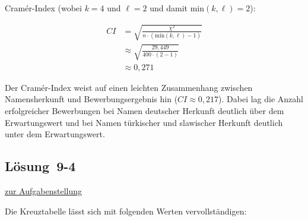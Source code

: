 \documentclass[
  11pt,
  ngerman,
  a4paper,
]{report}
\begin{document}
Cramér-Index (wobei \(k=4\) und \(\ell=2\) und damit \(\mathrm{min}(k,\ell)=2\)):

\[
\begin{aligned}
\mathit{CI}&=\sqrt{\frac{\chi^2}{n\cdot (\mathrm{min}(k, \ell)-1)}}\\[6pt]
&\approx\sqrt{\frac{29{,}449}{400\cdot(2-1)}}\\[4pt]
&\approx0{,}271
\end{aligned}
\]

Der Cramér-Index weist auf einen leichten Zusammenhang zwischen Namensherkunft und Bewerbungsergebnis hin (\(\mathit{CI}\approx0{,}217\)). Dabei lag die Anzahl erfolgreicher Bewerbungen bei Namen deutscher Herkunft deutlich über dem Erwartungswert und bei Namen türkischer und slawischer Herkunft deutlich unter dem Erwartungswert.

\hypertarget{loesung-9-4}{%
\subsection{Lösung~9-4}\label{loesung-9-4}}

\protect\hyperlink{aufgabe-9-4}{zur Aufgabenstellung}

Die Kreuztabelle lässt sich mit folgenden Werten vervollständigen:
\end{document}
